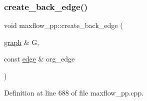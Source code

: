 \subsubsection{\texorpdfstring{create\+\_\+back\+\_\+edge()}{create\_back\_edge()}}
{\footnotesize\ttfamily void maxflow\+\_\+pp\+::create\+\_\+back\+\_\+edge (\begin{DoxyParamCaption}\item[{\mbox{\hyperlink{classgraph}{graph}} \&}]{G,  }\item[{const \mbox{\hyperlink{classedge}{edge}} \&}]{org\+\_\+edge }\end{DoxyParamCaption})\hspace{0.3cm}{\ttfamily [protected]}}



Definition at line 688 of file maxflow\+\_\+pp.\+cpp.


